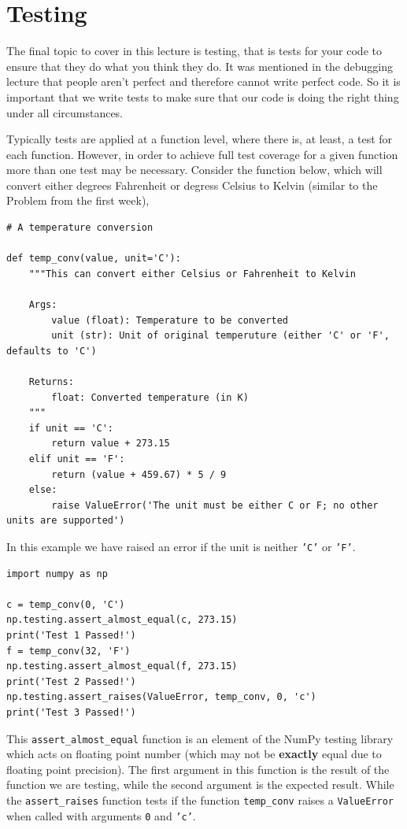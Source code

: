 \documentclass[a4paper]{article}
\begin{document}
\section{Testing}
The final topic to cover in this lecture is testing, that is tests for your code to ensure that they do what you think they do.
It was mentioned in the debugging lecture that people aren't perfect and therefore cannot write perfect code.
So it is important that we write tests to make sure that our code is doing the right thing under all circumstances.

Typically tests are applied at a function level, where there is, at least, a test for each function.
However, in order to achieve full test coverage for a given function more than one test may be necessary.
Consider the function below, which will convert either degrees Fahrenheit or degress Celsius to Kelvin (similar to the Problem from the first week),
\begin{lstlisting}
# A temperature conversion

def temp_conv(value, unit='C'):
    """This can convert either Celsius or Fahrenheit to Kelvin

    Args:
        value (float): Temperature to be converted
        unit (str): Unit of original temperuture (either 'C' or 'F', defaults to 'C')

    Returns:
        float: Converted temperature (in K)
    """
    if unit == 'C':
        return value + 273.15
    elif unit == 'F':
        return (value + 459.67) * 5 / 9
    else:
        raise ValueError('The unit must be either C or F; no other units are supported')
\end{lstlisting}
In this example we have raised an error if the unit is neither \texttt{'C'} or \texttt{'F'}.

\begin{lstlisting}
import numpy as np

c = temp_conv(0, 'C')
np.testing.assert_almost_equal(c, 273.15)
print('Test 1 Passed!')
f = temp_conv(32, 'F')
np.testing.assert_almost_equal(f, 273.15)
print('Test 2 Passed!')
np.testing.assert_raises(ValueError, temp_conv, 0, 'c')
print('Test 3 Passed!')
\end{lstlisting}
This \texttt{assert\_almost\_equal} function is an element of the NumPy testing library which acts on floating point number (which may not be \textbf{exactly} equal due to floating point precision).
The first argument in this function is the result of the function we are testing, while the second argument is the expected result.
While the \texttt{assert\_raises} function tests if the function \texttt{temp\_conv} raises a \texttt{ValueError} when called with arguments \texttt{0} and \texttt{'c'}.
\end{document}

